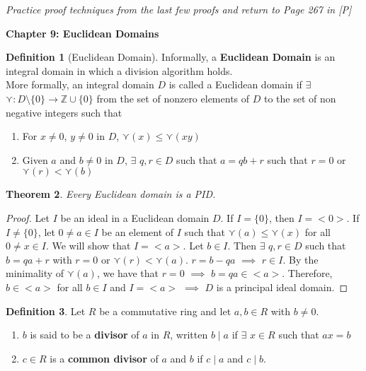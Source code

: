 \documentclass[11pt]{article}
\newtheorem{thm}{Theorem}[section]
\theoremstyle{definition}
\newtheorem{definition}[thm]{Definition}
\numberwithin{equation}{section}
\newcommand{\Z}{\mathbb{Z}}
\begin{document}
\textit{Practice proof techniques from the last few proofs and return to Page 267 in [P]}

\textbf{Chapter 9: Euclidean Domains}

\begin{definition}[Euclidean Domain]
Informally, a \textbf{Euclidean Domain} is an integral domain in which a division algorithm holds.\\
More formally, an integral domain $D$ is called a Euclidean domain if $\exists$ $\curlyvee: D \setminus \{0\} \rightarrow \Z \cup \{0\}$ from the set of nonzero elements of $D$ to the set of non negative integers such that
\begin{enumerate}
    \item For $x \neq 0$, $y \neq 0$ in $D$, $\curlyvee(x) \leq \curlyvee(xy)$
    \item Given $a$ and $b \neq 0$ in $D$, $\exists$ $q, r \in D$ such that $a = qb+r$ such that $r = 0$ or $\curlyvee(r) < \curlyvee(b)$
\end{enumerate}
\end{definition}

\begin{thm}
Every Euclidean domain is a PID.
\end{thm}

\begin{proof}
Let $I$ be an ideal in a Euclidean domain $D$. If $I = \{0\}$, then $I = <0>$. If $I \neq \{0\}$, let $0 \neq a \in I$ be an element of $I$ such that $\curlyvee(a) \leq \curlyvee(x)$ for all $0 \neq x \in I$. We will show that $I =<a>$. Let $b \in I$. Then $\exists$ $q, r \in D$ such that $b = qa+r$ with $r= 0$ or $\curlyvee(r)<\curlyvee(a)$. $r = b-qa$ $\implies$ $r \in I$. By the minimality of $\curlyvee(a)$, we have that $r = 0$ $\implies$ $b = qa \in <a>$. Therefore, $b \in <a>$ for all $b \in I$ and $I = <a>$ $\implies$ $D$ is a principal ideal domain.
\end{proof}

\begin{definition}
Let $R$ be a commutative ring and let $a, b \in R$ with $b \neq 0$.\\
\begin{enumerate}
    \item $b$ is said to be a \textbf{divisor} of $a$ in $R$, written $b \mid a$ if $\exists$ $x \in R$ such that $ax = b$
    \item $c \in R$ is a \textbf{common divisor} of $a$ and $b$ if $c \mid a$ and $c \mid b$.
\end{enumerate}
\end{definition}
\end{document}
